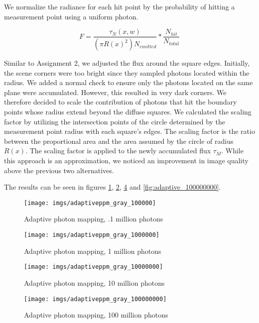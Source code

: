 We normalize the radiance for each hit point by the probability of hitting a measurement point using a uniform photon.

$$ F = \frac{\tau_{N}(x, w)}{(\pi R(x)^2) N_{emitted}}*\frac{N_{hit}}{N_{total}} $$

Similar to Assignment 2, we adjusted the flux around the square edges. Initially, the scene corners were too bright since they sampled photons located within the radius. We added a normal check to ensure only the photons located on the same plane were accumulated. However, this resulted in very dark corners. We therefore decided to scale the contribution of photons that hit the boundary points whose radius extend beyond the diffuse squares. We calculated the scaling factor by utilizing the intersection points of the circle determined by the measurement point radius with each square's edges. The scaling factor is the ratio between the proportional area and the area assumed by the circle of radius $R(x)$. The scaling factor is applied to the newly accumulated flux $\tau_M$. While this approach is an approximation, we noticed an improvement in image quality above the previous two alternatives.

The results can be seen in figures \ref{fig:adaptive_100000}, \ref{fig:adaptive_1000000}, \ref{fig:adaptive_10000000} and \ref{fig:adaptive_100000000}.

\begin{figure}[H]
    \centering
    \texttt{[image: imgs/adaptiveppm\_gray\_100000]}\\
    \caption{Adaptive photon mapping, .1 million photons}
    \label{fig:adaptive_100000}
\end{figure}

\begin{figure}[H]
    \centering
    \texttt{[image: imgs/adaptiveppm\_gray\_1000000]}\\
    \caption{Adaptive photon mapping, 1 million photons}
    \label{fig:adaptive_1000000}
\end{figure}

\begin{figure}[H]
    \centering
    \texttt{[image: imgs/adaptiveppm\_gray\_10000000]}\\
    \caption{Adaptive photon mapping, 10 million photons}
    \label{fig:adaptive_10000000}
\end{figure}

\begin{figure}[H]
    \centering
    \texttt{[image: imgs/adaptiveppm\_gray\_100000000]}\\
    \caption{Adaptive photon mapping, 100 million photons}
    \label{fig:adaptive_10000000}
\end{figure}
\pagebreak

